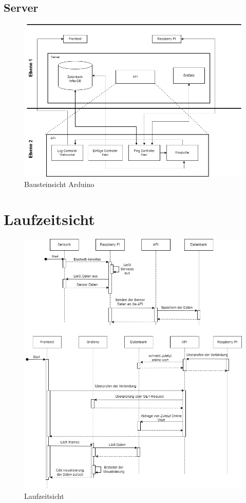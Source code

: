 \documentclass[
]{article}
\begin{document}
\subsection{Server}
\begin{figure}[H]
	\centering
	\includegraphics[width=130mm]{resources/Bausteinsicht_Server.png}
	\caption{Bausteinsicht Arduino}
	\label{fig:BausteinServer}
\end{figure}  

\section{Laufzeitsicht}
\begin{figure}[H]
	\centering
	\includegraphics[width=160mm]{resources/Laufzeitsicht.png}
	\caption{Laufzeitsicht}
	\label{fig:Laufzeitsicht}
\end{figure}  
\end{document}
